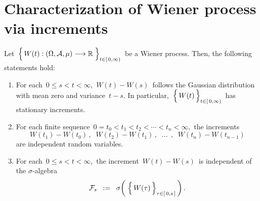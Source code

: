 

\section{Characterization of Wiener process via increments}
\setcounter{theorem}{0}
\setcounter{equation}{0}


\renewcommand{\theenumi}{\roman{enumi}}
\renewcommand{\labelenumi}{\textnormal{(\theenumi)}$\;\;$}


\begin{proposition}
\label{WienerProcessIncrements}
\mbox{}
\vskip 0.2cm
\noindent
Let
\,$\left\{\,\overset{{\color{white}.}}{W}(t) : (\Omega,\mathcal{A},\mu) \longrightarrow \Re \;\right\}_{t \in[\,0,\infty)}$\,
be a Wiener process.
Then, the following statements hold:
\begin{enumerate}
\item
	For each \,$0 \leq s < t < \infty$,
	\,$W(t) - W(s)$\, follows the Gaussian distribution with mean zero and variance \,$t-s$.
	In particular,
	\,$\left\{\,\overset{{\color{white}.}}{W}(t)\,\right\}_{t \in[\,0,\infty)}$\,
	has stationary increments.
\item
	For each finite sequence \,$0 = t_{0} < t_{1} < t_{2} < \cdots < t_{n} < \infty$,\,
	the increments
	\begin{equation*}
	W(t_{1}) - W(t_{0})\,,\;\;
	W(t_{2}) - W(t_{1})\,,\;\;
	\ldots\;\,,\;\;
	W(t_{n}) - W(t_{n-1})
	\end{equation*}
	are independent random variables.
\item
	For each \,$0 \leq s < t < \infty$,\,
	the increment \,$W(t) - W(s)$\,
	is independent of the $\sigma$-algebra
	\begin{equation*}
	\mathcal{F}_{s}
	\;\; := \;\;
		\sigma\!\left(\;\left\{\,
			\overset{{\color{white}.}}{W}(\tau)
			\,\right\}_{\tau \in [\,0,s\,]}\,\right).
	\end{equation*}
\end{enumerate}
\end{proposition}
\proof
